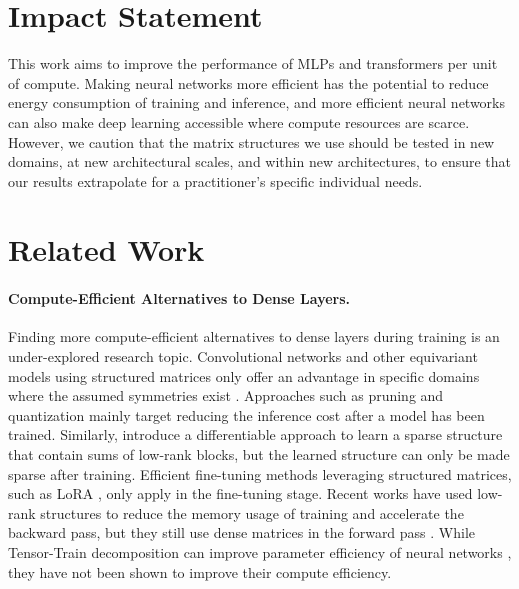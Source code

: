 \documentclass{article}
\theoremstyle{plain}
\theoremstyle{definition}
\theoremstyle{remark}
\begin{document}
\clearpage

\section*{Impact Statement}
This work aims to improve the performance of MLPs and transformers per unit of compute.  Making neural networks more efficient has the potential to reduce energy consumption of training and inference, and more efficient neural networks can also make deep learning accessible where compute resources are scarce.  However, we caution that the matrix structures we use should be tested in new domains, at new architectural scales, and within new architectures, to ensure that our results extrapolate for a practitioner's specific individual needs.




\newpage
\appendix
\onecolumn

\section{Related Work}
\paragraph{Compute-Efficient Alternatives to Dense Layers.}
Finding more compute-efficient alternatives to dense layers during training is an under-explored research topic. Convolutional networks and other equivariant models using structured matrices only offer an advantage in specific domains where the assumed symmetries exist \citep{lecun1998gradient, finzi2020generalizing}. Approaches such as pruning and quantization \citep{han2016deep, molchanov2016prun, liu2017slim, frankle2018ticket, mishra2021accelerating} mainly target reducing the inference cost after a model has been trained. Similarly, \citet{lee2023differentiable} introduce a differentiable approach to learn a sparse structure that contain sums of low-rank blocks, but the learned structure can only be made sparse after training. Efficient fine-tuning methods leveraging structured matrices, such as LoRA \citep{hu2021lora}, only apply in the fine-tuning stage. Recent works have used low-rank structures to reduce the memory usage of training and accelerate the backward pass, but they still use dense matrices in the forward pass \citep{zhao2024galore,lialin2023relora}. While Tensor-Train decomposition can improve parameter efficiency of neural networks \citep{chekalina2023gpttrans,novikov2015tt-nets}, they have not been shown to improve their compute efficiency. 
\end{document}
